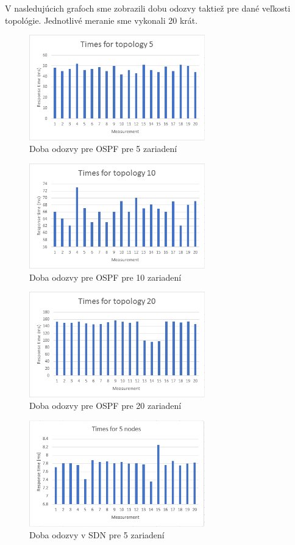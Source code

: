 \documentclass[conference]{IEEEtran}
\begin{document}
\newpage
V nasledujúcich grafoch sme zobrazili dobu odozvy taktiež pre dané veľkosti topológie. Jednotlivé meranie sme vykonali 20 krát.

\begin{figure}[h!]
\centering
\includegraphics[width=3in]{../img/5responseospf}
\caption{Doba odozvy pre OSPF pre 5 zariadení}
\end{figure}

\begin{figure}[h!]
\centering
\includegraphics[width=3in]{../img/10responseospf}
\caption{Doba odozvy pre OSPF pre 10 zariadení}
\end{figure}

\begin{figure}[h!]
\centering
\includegraphics[width=3in]{../img/20responseospf}
\caption{Doba odozvy pre OSPF pre 20 zariadení}
\end{figure}

\begin{figure}[h!]
\centering
\includegraphics[width=3in]{../img/5responseSDN}
\caption{Doba odozvy v SDN pre 5 zariadení}
\end{figure}
\end{document}
